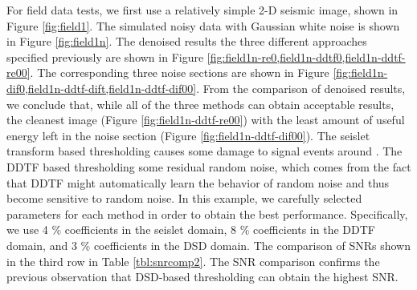 For field data tests, we first use a relatively simple 2-D seismic image, shown in Figure \ref{fig:field1}. The simulated noisy data with Gaussian white noise is shown in Figure \ref{fig:field1n}. The denoised results  the three different approaches specified previously are shown in Figure \ref{fig:field1n-re0,field1n-ddtf0,field1n-ddtf-re00}.  The corresponding three noise sections are shown in Figure \ref{fig:field1n-dif0,field1n-ddtf-dift,field1n-ddtf-dif00}. From the comparison of denoised results, we conclude that, while all of the three methods can obtain acceptable results,   the cleanest image (Figure \ref{fig:field1n-ddtf-re00}) with the least amount of useful energy left in the noise section (Figure \ref{fig:field1n-ddtf-dif00}). The seislet transform based thresholding causes some damage to signal events around . The DDTF based thresholding   some residual random noise, which comes from the fact that DDTF might automatically learn the behavior of random noise and thus become sensitive to random noise. %
In this example, we carefully selected parameters for each method in order to obtain the best performance. Specifically, we use 4 \% coefficients in the seislet domain, 8 \% coefficients in the DDTF domain, and 3 \% coefficients in the DSD domain. %
The comparison of SNRs  shown in the third row in Table \ref{tbl:snrcomp2}. The SNR comparison confirms the previous observation that DSD-based thresholding can obtain the highest SNR.




